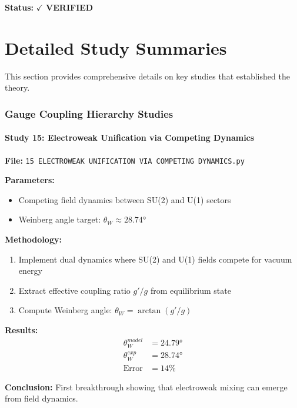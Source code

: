 \documentclass[11pt, a4paper]{article}
\theoremstyle{remark}
\begin{document}
\textbf{Status:} $\checkmark$ \textbf{VERIFIED}

\newpage
\part{Detailed Study Summaries}

This section provides comprehensive details on key studies that established the theory.

\section{Gauge Coupling Hierarchy Studies}

\subsection{Study 15: Electroweak Unification via Competing Dynamics}

\textbf{File:} \texttt{15 ELECTROWEAK UNIFICATION VIA COMPETING DYNAMICS.py}

\textbf{Parameters:}
\begin{itemize}
    \item Competing field dynamics between SU(2) and U(1) sectors
    \item Weinberg angle target: $\theta_W \approx 28.74°$
\end{itemize}

\textbf{Methodology:}
\begin{enumerate}
    \item Implement dual dynamics where SU(2) and U(1) fields compete for vacuum energy
    \item Extract effective coupling ratio $g'/g$ from equilibrium state
    \item Compute Weinberg angle: $\theta_W = \arctan(g'/g)$
\end{enumerate}

\textbf{Results:}
\begin{align}
\theta_W^{model} &= 24.79° \\
\theta_W^{exp} &= 28.74° \\
\text{Error} &= 14\%
\end{align}

\textbf{Conclusion:} First breakthrough showing that electroweak mixing can emerge from field dynamics.
\end{document}
